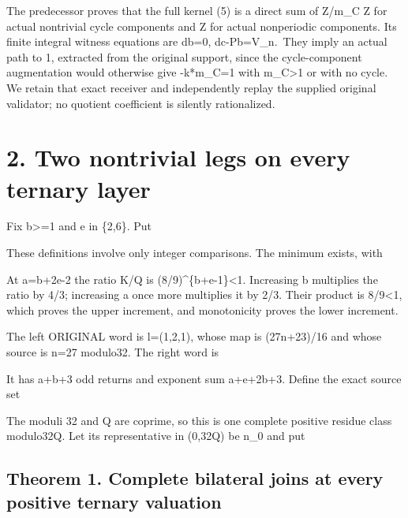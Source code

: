 The predecessor proves that the full kernel (5) is a direct sum of
Z/m\_C Z for actual nontrivial cycle components and Z for actual
nonperiodic components. Its finite integral witness equations are db=0,
dc-Pb=V\_n.~They imply an actual path to 1, extracted from the original
support, since the cycle-component augmentation would otherwise give
-k*m\_C=1 with m\_C\textgreater1 or with no cycle. We retain that exact
receiver and independently replay the supplied original validator; no
quotient coefficient is silently rationalized.

\section{2. Two nontrivial legs on every ternary layer}

Fix b\textgreater=1 and e in \{2,6\}. Put


These definitions involve only integer comparisons. The minimum exists,
with


At a=b+2e-2 the ratio K/Q is (8/9)\^{}\{b+e-1\}\textless1. Increasing b
multiplies the ratio by 4/3; increasing a once more multiplies it by
2/3. Their product is 8/9\textless1, which proves the upper increment,
and monotonicity proves the lower increment.

The left ORIGINAL word is l=(1,2,1), whose map is (27n+23)/16 and whose
source is n=27 modulo32. The right word is


It has a+b+3 odd returns and exponent sum a+e+2b+3. Define the exact
source set


The moduli 32 and Q are coprime, so this is one complete positive
residue class modulo32Q. Let its representative in (0,32Q) be n\_0 and
put


\subsection{Theorem 1. Complete bilateral joins at every positive
ternary valuation}

